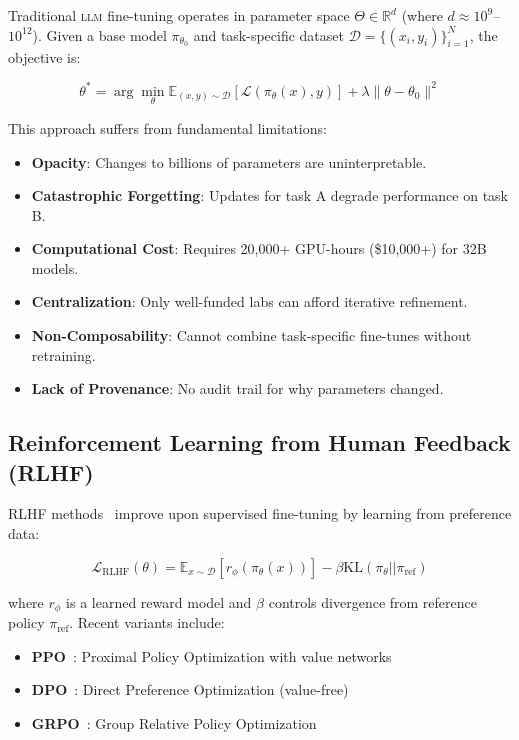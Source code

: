 \documentclass[11pt,letterpaper]{article}
\newcommand{\LLM}{\textsc{llm}}
\begin{document}
Traditional \LLM{} fine-tuning operates in parameter space $\Theta \in \mathbb{R}^d$ (where $d \approx 10^{9}$--$10^{12}$). Given a base model $\pi_{\theta_0}$ and task-specific dataset $\mathcal{D} = \{(x_i, y_i)\}_{i=1}^N$, the objective is:

\begin{equation}
\theta^* = \arg\min_{\theta} \mathbb{E}_{(x,y) \sim \mathcal{D}}[\mathcal{L}(\pi_\theta(x), y)] + \lambda \|\theta - \theta_0\|^2
\end{equation}

This approach suffers from fundamental limitations:

\begin{itemize}
    \item \textbf{Opacity}: Changes to billions of parameters are uninterpretable.
    \item \textbf{Catastrophic Forgetting}: Updates for task A degrade performance on task B.
    \item \textbf{Computational Cost}: Requires 20,000+ GPU-hours (\$10,000+) for 32B models.
    \item \textbf{Centralization}: Only well-funded labs can afford iterative refinement.
    \item \textbf{Non-Composability}: Cannot combine task-specific fine-tunes without retraining.
    \item \textbf{Lack of Provenance}: No audit trail for why parameters changed.
\end{itemize}

\subsection{Reinforcement Learning from Human Feedback (RLHF)}

RLHF methods~\cite{christiano2017deep,ouyang2022training} improve upon supervised fine-tuning by learning from preference data:

\begin{equation}
\mathcal{L}_{\text{RLHF}}(\theta) = \mathbb{E}_{x \sim \mathcal{D}}[r_\phi(\pi_\theta(x))] - \beta \text{KL}(\pi_\theta || \pi_{\text{ref}})
\end{equation}

where $r_\phi$ is a learned reward model and $\beta$ controls divergence from reference policy $\pi_{\text{ref}}$. Recent variants include:

\begin{itemize}
    \item \textbf{PPO}~\cite{schulman2017proximal}: Proximal Policy Optimization with value networks
    \item \textbf{DPO}~\cite{rafailov2023direct}: Direct Preference Optimization (value-free)
    \item \textbf{GRPO}~\cite{shao2024deepseekmath}: Group Relative Policy Optimization
\end{itemize}
\end{document}
